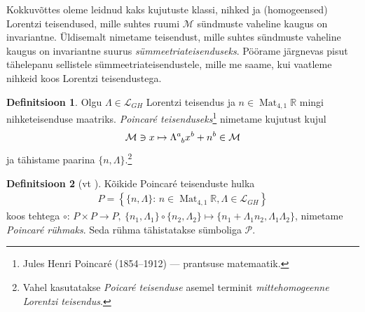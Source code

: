 \documentclass[12pt,a4paper,oneside]{article}
\theoremstyle{plain}
\theoremstyle{definition}
\newtheorem{definitsioon}{Definitsioon}[section]
\numberwithin{equation}{section}
\def\R{{\mathbb R}}
\def\L{{\mathcal L}}
\def\M{{\mathcal M}}
\def\P{{\mathcal P}}
\DeclareMathOperator{\Mat}{Mat}
\begin{document}
Kokkuvõttes oleme leidnud kaks kujutuste klassi, nihked ja 
(homogeensed) \mbox{Lorentzi} teisendused, mille suhtes ruumi $\M$ 
sündmuste vaheline kaugus on invariantne. Üldisemalt nimetame 
teisendust, mille suhtes sündmuste vaheline kaugus on invariantne 
suurus \emph{sümmeetriateisenduseks}. Pöörame järgnevas pisut 
tähele\-panu sellistele sümmeetria\-teisendustele, mille me saame, kui 
vaatleme nihkeid koos Lorentzi teisendustega.

\begin{definitsioon}
Olgu $\Lambda \in \L_{GH}$ Lorentzi teisendus ja 
$n \in \Mat_{4, 1}\R$ mingi nihke\-teisenduse maatriks. 
\emph{Poincar\'e teisenduseks}\footnote{Jules Henri Poincaré 
(1854--1912) --- prantsuse matemaatik.} nimetame kujutust kujul
\begin{align*}
\M \ni x \mapsto \Lambda\indices{^a_b} x^b + n^b \in \M
\end{align*}
ja tähistame paarina $\{n, \Lambda\}$.\footnote{Vahel 
kasutatakse \emph{Poicar\'e teisenduse} asemel terminit 
\emph{mittehomogeenne Lorentzi teisendus}.}
\end{definitsioon}

\begin{definitsioon} [vt \textnormal{\cite{Barut}}]
Kõikide Poincar\'e teisenduste hulka
\begin{align*}
P = \left\lbrace \{n, \Lambda\} \colon\, n \in \Mat_{4, 1}\R, \Lambda \in 
\L_{GH} \right\rbrace
\end{align*}
koos tehtega $\circ \colon\, P \times P \rightarrow P,\ \{n_1, \Lambda_1\} 
\circ \{n_2, \Lambda_2\} \mapsto \{n_1 + \Lambda_1 n_2, \Lambda_1 
\Lambda_2\}$, nimetame \emph{Poincar\'e rühmaks}. Seda rühma 
tähistatakse sümboliga $\P$.
\end{definitsioon}
\end{document}
